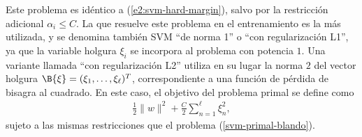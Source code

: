 %
Este problema es idéntico a (\ref{e2:svm-hard-margin}), salvo por la
restricción adicional $\alpha_i\leq C$.
La \MVS{} que resuelve este problema en el entrenamiento es la más
utilizada, y se denomina también SVM ``de norma 1'' o ``con
regularización L1'', ya que la variable holgura $\xi_i$ se incorpora
al problema con potencia $1$.
Una variante llamada ``con regularización L2'' utiliza en su lugar la
norma $2$ del vector holgura $\B{\xi}=(\xi_1,\ldots,\xi_\ell)^T$,
correspondiente a una función de pérdida de bisagra al cuadrado.
En este caso, el objetivo del problema primal se define como
%
\begin{align}\label{svm-l2}
  \frac{1}{2}\|w\|^2+\frac{C}{2}\sum_{n=1}^{\ell}\xi_n^2,
\end{align}
%
sujeto a las mismas restricciones que el problema
(\ref{svm-primal-blando}).
